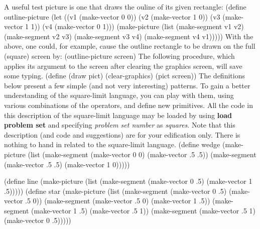 A useful test picture is one that draws the ouline of its given
rectangle: 
\beginlisp
(define outline-picture
  (let ((v1 (make-vector 0 0))
        (v2 (make-vector 1 0))
        (v3 (make-vector 1 1))
        (v4 (make-vector 0 1)))
    (make-picture (list (make-segment v1 v2)
                        (make-segment v2 v3)
                        (make-segment v3 v4)
                        (make-segment v4 v1)))))
\endlisp
With the above, one could, for example, cause the outline rectangle to
be drawn on the full (square) screen by:
\beginlisp
(outline-picture screen)
\endlisp
The following procedure, which applies its argument to the screen after
clearing the graphics screen, will save some typing.
\beginlisp
(define (draw pict)
  (clear-graphics)
  (pict screen))
\endlisp
The definitions below present a few simple (and not very interesting)
patterns.  To gain a better understanding of the square-limit language,
you can play with them, using various combinations of the
operators, and define new primitives.
All the code in this description of the square-limit language may be
loaded by using {\bf load problem set} and specifying {\it problem set number}
as {\it squares}.  Note that this description (and code and suggestions)
are for your edification only.  There is nothing to hand in related to
the square-limit language.
\beginlisp
(define wedge (make-picture
               (list (make-segment (make-vector 0 0)
                                   (make-vector .5 .5))
                     (make-segment (make-vector .5 .5)
                                   (make-vector 1 0)))))

\pbrk
(define line (make-picture
              (list (make-segment (make-vector 0 .5)
                                  (make-vector 1 .5)))))
\pbrk
(define star (make-picture
              (list (make-segment (make-vector 0 .5)
                                  (make-vector .5 0))
                    (make-segment (make-vector .5 0)
                                  (make-vector 1 .5))
                    (make-segment (make-vector 1 .5)
                                  (make-vector .5 1))
                    (make-segment (make-vector .5 1)
                                  (make-vector 0 .5)))))
\endlisp

